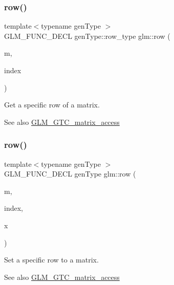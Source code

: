 \subsubsection{\texorpdfstring{row()}{row()}\hspace{0.1cm}{\footnotesize\ttfamily [1/2]}}
{\footnotesize\ttfamily template$<$typename gen\+Type $>$ \\
G\+L\+M\+\_\+\+F\+U\+N\+C\+\_\+\+D\+E\+CL gen\+Type\+::row\+\_\+type glm\+::row (\begin{DoxyParamCaption}\item[{gen\+Type const \&}]{m,  }\item[{length\+\_\+t}]{index }\end{DoxyParamCaption})}

Get a specific row of a matrix. \begin{DoxySeeAlso}{See also}
\hyperlink{group__gtc__matrix__access}{G\+L\+M\+\_\+\+G\+T\+C\+\_\+matrix\+\_\+access} 
\end{DoxySeeAlso}
\mbox{\label{group__gtc__matrix__access_gaadcc64829aadf4103477679e48c7594f}} 
\subsubsection{\texorpdfstring{row()}{row()}\hspace{0.1cm}{\footnotesize\ttfamily [2/2]}}
{\footnotesize\ttfamily template$<$typename gen\+Type $>$ \\
G\+L\+M\+\_\+\+F\+U\+N\+C\+\_\+\+D\+E\+CL gen\+Type glm\+::row (\begin{DoxyParamCaption}\item[{gen\+Type const \&}]{m,  }\item[{length\+\_\+t}]{index,  }\item[{typename gen\+Type\+::row\+\_\+type const \&}]{x }\end{DoxyParamCaption})}

Set a specific row to a matrix. \begin{DoxySeeAlso}{See also}
\hyperlink{group__gtc__matrix__access}{G\+L\+M\+\_\+\+G\+T\+C\+\_\+matrix\+\_\+access} 
\end{DoxySeeAlso}
